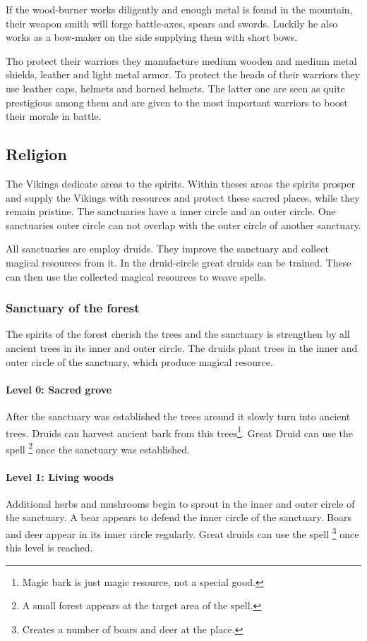 \documentclass[a4paper]{book}
\begin{document}
If the wood-burner works diligently and enough metal is found in the mountain,
their weapon smith will forge battle-axes, spears and swords. Luckily he also
works as a bow-maker on the side supplying them with short bows.

Tho protect their warriors they manufacture medium wooden and medium metal
shields, leather and light metal armor. To protect the heads of their warriors
they use leather caps, helmets and horned helmets. The latter one are seen as
quite prestigious among them and are given to the most important warriors to
boost their morale in battle.

\subsection{Religion}
The \gls{Vikings} dedicate areas to the spirits. Within theses areas the
spirits prosper and supply the \gls{Vikings} with resources and protect these
sacred places, while they remain pristine. The sanctuaries have a inner circle
and an outer circle. One sanctuaries outer circle can not overlap with the
outer circle of another sanctuary.

All sanctuaries are employ druids. They improve the sanctuary and collect
magical resources from it. In the druid-circle great druids can be trained.
These can then use the collected magical resources to weave spells.

\subsubsection{Sanctuary of the forest}
The spirits of the forest cherish the trees and the sanctuary is strengthen by
all ancient trees in its inner and outer circle. The druids plant trees in the
inner and outer circle of the sanctuary, which produce magical resource.

\paragraph{Level 0: Sacred grove}
After the sanctuary was established the trees around it slowly turn into
ancient trees. Druids can harvest ancient bark from this trees\footnote{ Magic
	bark is just magic resource, not a special good. }. Great Druid can use the
spell \footnote{ A small forest appears at the target
	area of the spell. } once the sanctuary was established.

\paragraph{Level 1: Living woods}
Additional herbs and mushrooms begin to sprout in the inner and outer circle of
the sanctuary. A bear appears to defend the inner circle of the sanctuary.
Boars and deer appear in its inner circle regularly. Great druids can use the
spell \footnote{ Creates a number of boars and deer
	at the place. } once this level is reached.
\end{document}

